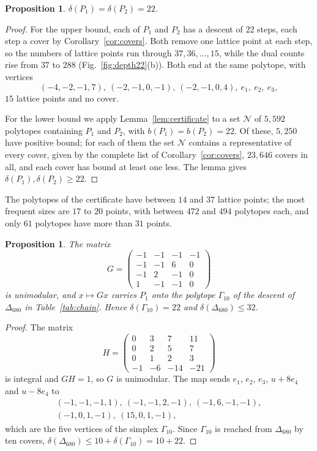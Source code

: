 \documentclass[11pt]{amsart}
\newtheorem{proposition}[theorem]{Proposition}
\theoremstyle{definition}
\theoremstyle{remark}
\newcommand{\Dbig}{\Delta_{680}}
\begin{document}
\begin{proposition}\label{prop:depth22}
$\delta(P_1)=\delta(P_2)=22$.
\end{proposition}

\begin{proof}
For the upper bound, each of $P_1$ and $P_2$ has a descent of $22$ steps,
each step a cover by Corollary~\ref{cor:covers}. Both remove one lattice
point at each step, so the numbers of lattice points run through
$37,36,\dots,15$, while the dual counts rise from $37$ to $288$
(Fig.~\ref{fig:depth22}(b)). Both end at the same polytope, with vertices
\[
(-4,-2,-1,7),\ (-2,-1,0,-1),\ (-2,-1,0,4),\ e_1,\ e_2,\ e_3,
\]
$15$ lattice points and no cover.

For the lower bound we apply Lemma~\ref{lem:certificate} to a set
$\mathcal{N}$ of $5{,}592$ polytopes containing $P_1$ and $P_2$, with
$b(P_1)=b(P_2)=22$. Of these, $5{,}250$ have positive bound; for each of
them the set $\mathcal{N}$ contains a representative of every cover, given
by the complete list of Corollary~\ref{cor:covers}, $23{,}646$ covers in
all, and each cover has bound at least one less. The lemma gives
$\delta(P_1),\delta(P_2)\ge22$.
\end{proof}

The polytopes of the certificate have between $14$ and $37$ lattice
points; the most frequent sizes are $17$ to $20$ points, with between
$472$ and $494$ polytopes each, and only $61$ polytopes have more than
$31$ points.

\begin{proposition}\label{prop:gamma10}
The matrix
\[
G=\begin{pmatrix}-1&-1&-1&-1\\-1&-1&6&0\\-1&2&-1&0\\1&-1&-1&0\end{pmatrix}
\]
is unimodular, and $x\mapsto Gx$ carries $P_1$ onto the polytope
$\Gamma_{10}$ of the descent of $\Dbig$ in Table~\ref{tab:chain}. Hence
$\delta(\Gamma_{10})=22$ and $\delta(\Dbig)\le32$.
\end{proposition}

\begin{proof}
The matrix
\[
H=\begin{pmatrix}0&3&7&11\\0&2&5&7\\0&1&2&3\\-1&-6&-14&-21\end{pmatrix}
\]
is integral and $GH=1$, so $G$ is unimodular. The map sends $e_1$, $e_2$,
$e_3$, $u+8e_4$ and $u-8e_4$ to
\begin{gather*}
(-1,-1,-1,1),\ (-1,-1,2,-1),\ (-1,6,-1,-1),\\
(-1,0,1,-1),\ (15,0,1,-1),
\end{gather*}
which are the five vertices of the simplex $\Gamma_{10}$. Since
$\Gamma_{10}$ is reached from $\Dbig$ by ten covers,
$\delta(\Dbig)\le10+\delta(\Gamma_{10})=10+22$.
\end{proof}
\end{document}
